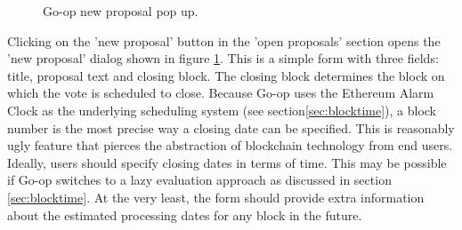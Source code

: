 \begin{figure}
\centering
{}
\decoRule
\caption[Go-op New Proposal Pop Up]{Go-op new proposal pop up.}
\label{fig:createproposal}
\end{figure}

Clicking on the 'new proposal' button in the 'open proposals' section opens the 'new proposal' dialog shown in figure \ref{fig:createproposal}. This is a simple form with three fields: title, proposal text and closing block. The closing block determines the block on which the vote is scheduled to close. Because Go-op uses the Ethereum Alarm Clock as the underlying scheduling system (see section\ref{sec:blocktime}), a block number is the most precise way a closing date can be specified. This is reasonably ugly feature that pierces the abstraction of blockchain technology from end users. Ideally, users should specify closing dates in terms of time. This may be possible if Go-op switches to a lazy evaluation approach as discussed in section \ref{sec:blocktime}. At the very least, the form should provide extra information about the estimated processing dates for any block in the future. 
 

